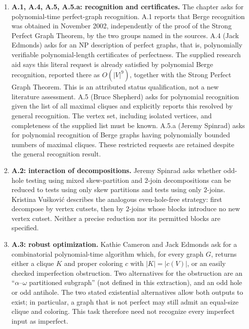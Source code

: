 \documentclass[11pt]{article}
\begin{document}
\begin{enumerate}
\item \textbf{A.1, A.4, A.5, A.5.a: recognition and certificates.} The chapter asks for polynomial-time perfect-graph recognition. A.1 reports that Berge recognition was obtained in November 2002, independently of the proof of the Strong Perfect Graph Theorem, by the two groups named in the sources. A.4 (Jack Edmonds) asks for an NP description of perfect graphs, that is, polynomially verifiable polynomial-length certificates of perfectness. The supplied research aid says this literal request is already satisfied by polynomial Berge recognition, reported there as $O(|V|^9)$, together with the Strong Perfect Graph Theorem. This is an attributed status qualification, not a new literature assessment. A.5 (Bruce Shepherd) asks for polynomial recognition given the list of all maximal cliques and explicitly reports this resolved by general recognition. The vertex set, including isolated vertices, and completeness of the supplied list must be known. A.5.a (Jeremy Spinrad) asks for polynomial recognition of Berge graphs having polynomially bounded numbers of maximal cliques. These restricted requests are retained despite the general recognition result.
\item \textbf{A.2: interaction of decompositions.} Jeremy Spinrad asks whether odd-hole testing using mixed skew-partition and $2$-join decompositions can be reduced to tests using only skew partitions and tests using only $2$-joins. Kristina Vu\v{s}kovi\'c describes the analogous even-hole-free strategy: first decompose by vertex cutsets, then by $2$-joins whose blocks introduce no new vertex cutset. Neither a precise reduction nor its permitted blocks are specified.
\item \textbf{A.3: robust optimization.} Kathie Cameron and Jack Edmonds ask for a combinatorial polynomial-time algorithm which, for every graph $G$, returns either a clique $K$ and proper coloring $c$ with $|K|=|c(V)|$, or an easily checked imperfection obstruction. Two alternatives for the obstruction are an ``$\alpha$--$\omega$ partitioned subgraph'' (not defined in this extraction), and an odd hole or odd antihole. The two stated existential alternatives allow both outputs to exist; in particular, a graph that is not perfect may still admit an equal-size clique and coloring. This task therefore need not recognize every imperfect input as imperfect.


\end{enumerate}
\end{document}
